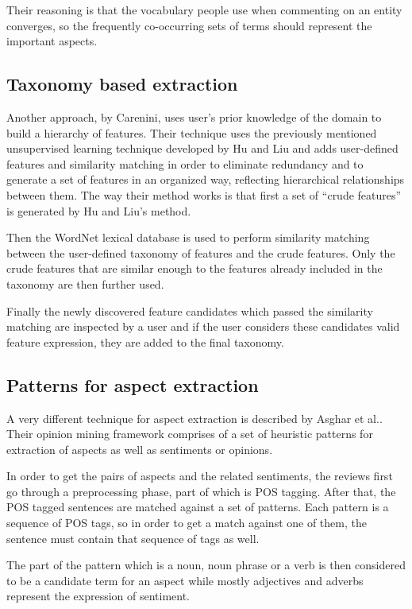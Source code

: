   Their reasoning is that the vocabulary people use when commenting on an entity converges, so the frequently co-occurring sets of terms should represent the important aspects.
\subsection{Taxonomy based extraction}
\label{sec:taxonomy}
 Another approach, by Carenini\cite{carenini_2005}, uses user's prior knowledge of the domain to build a hierarchy of features. Their technique uses the previously mentioned unsupervised learning technique developed by Hu and Liu and adds user-defined features and similarity matching in order to eliminate redundancy  and to generate a set of features in an organized way, reflecting hierarchical relationships between them.
The way their method works is that first a set of ``crude features'' is generated by Hu and Liu's method.

Then  the WordNet lexical database is used to perform similarity matching between the user-defined taxonomy of features and the crude features. Only the crude features that are similar enough to the features already included in the taxonomy are then further used. 

Finally the newly discovered feature candidates which passed the similarity matching are inspected by a user and if the user considers these candidates valid feature expression, they are added to the final taxonomy.
\subsection{Patterns for aspect extraction}
A very different technique for aspect extraction is described by Asghar et al.\cite{asghar_2019}. Their opinion mining framework comprises of a set of heuristic patterns for extraction of aspects as well as sentiments or opinions. 

In order to get the pairs of aspects and the related sentiments, the reviews first go through a preprocessing phase, part of which is POS tagging. After that, the POS tagged sentences are matched against a set of patterns. Each pattern is a sequence of POS tags, so in order to get a match against one of them, the sentence must contain that sequence of tags as well. 

The part of the pattern which is a noun, noun phrase or a verb is then considered to be a candidate term for an aspect while mostly adjectives and adverbs represent the expression of sentiment.
